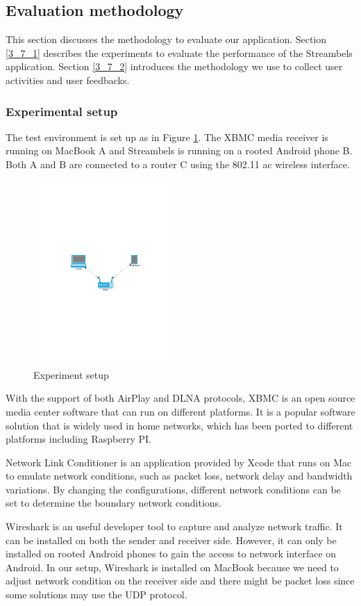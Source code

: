 \subsection{Evaluation methodology\label{3_7}}
This section discusses the methodology to evaluate our application. Section
\ref{3_7_1} describes the experiments to evaluate the performance of
the Streambels application. Section \ref{3_7_2} introduces the methodology we
use to collect user activities and user feedbacks.

\subsubsection{Experimental setup\label{3_7_1}}
The test environment is set up as in Figure \ref{setup}. The XBMC
media receiver is running on MacBook A and Streambels is running on a rooted
Android phone B. Both A and B are connected to a router C using the 802.11 ac
wireless interface. \\
\begin{figure}[htb]
\centering \includegraphics[height=7cm]{charts/experiment_setup}
\caption{Experiment setup \label{setup}}
\end{figure}
With the support of both AirPlay and DLNA protocols, XBMC is an open source media center software that can run on different platforms. It is a popular software solution that is widely used in home networks, which has been ported to different platforms including Raspberry PI.

Network Link Conditioner is an application provided by Xcode that runs on Mac to emulate network conditions, such as packet loss, network delay and bandwidth variations. By changing the configurations, different network conditions can be set to determine the boundary network conditions.

Wireshark is an useful developer tool to capture and analyze network traffic.
It can be installed on both the sender and receiver side. However, it can only
be installed on rooted Android phones to gain the access to network interface
on Android. In our setup, Wireshark is installed on MacBook because we need to
adjust network condition on the receiver side and there might be packet loss
since some solutions may use the UDP protocol.

